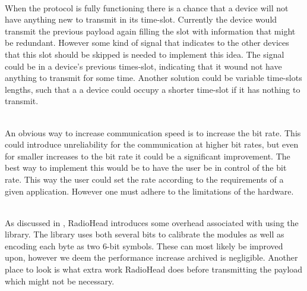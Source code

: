 \begin{description}[labelindent=\parindent]
    \item [Skip unnecessary transmissions]\hfill\\
When the protocol is fully functioning there is a chance that a device will not have anything new to transmit in its time-slot.
Currently the device would transmit the previous payload again filling the slot with information that might be redundant.
However some kind of signal that indicates to the other devices that this slot should be skipped is needed to implement this idea.
The signal could be in a device's previous times-slot, indicating that it wound not have anything to transmit for some time. 
Another solution could be variable time-slots lengths, such that a a device could occupy a shorter time-slot if it has nothing to transmit. 

    \item[Increase the bit rate]\hfill\\ 
An obvious way to increase communication speed is to increase the bit rate.
This could introduce unreliability for the communication at higher bit rates, but even for smaller increases to the bit rate it could be a significant improvement.
The best way to implement this would be to have the user be in control of the bit rate.
This way the user could set the rate according to the requirements of a given application.
However one must adhere to the limitations of the hardware.

    \item[Reduce overhead]\hfill\\
As discussed in , RadioHead introduces some overhead associated with using the library.
The library uses both several bits to calibrate the modules as well as encoding each byte as two 6-bit symbols.
These can most likely be improved upon, however we deem the performance increase archived is negligible.
Another place to look is what extra work RadioHead does before transmitting the payload which might not be necessary.
\end{description}

